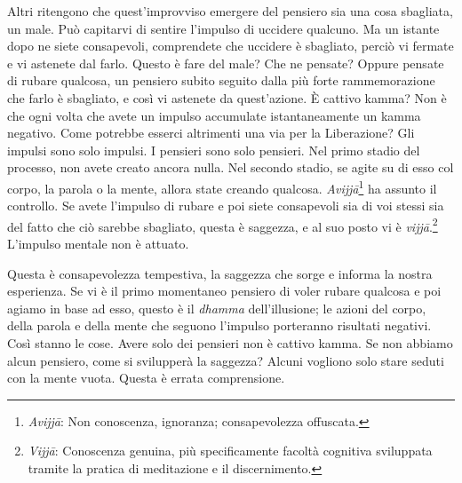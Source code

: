 Altri ritengono che quest'improvviso emergere del pensiero sia una cosa
sbagliata, un male. Può capitarvi di sentire l'impulso di uccidere
qualcuno. Ma un istante dopo ne siete consapevoli, comprendete che
uccidere è sbagliato, perciò vi fermate e vi astenete dal farlo. Questo
è fare del male? Che ne pensate? Oppure pensate di rubare qualcosa, un
pensiero subito seguito dalla più forte rammemorazione che farlo è
sbagliato, e così vi astenete da quest'azione. È cattivo kamma?
Non è che ogni volta che avete un impulso accumulate istantaneamente un
kamma negativo. Come potrebbe esserci altrimenti una via per la
Liberazione? Gli impulsi sono solo impulsi. I pensieri sono solo
pensieri. Nel primo stadio del processo, non avete creato ancora nulla.
Nel secondo stadio, se agite su di esso col corpo, la parola o la mente,
allora state creando qualcosa. \emph{Avijjā}\footnote{%
  \emph{Avijjā}: Non conoscenza, ignoranza; consapevolezza offuscata.}
ha assunto il
controllo. Se avete l'impulso di rubare e poi siete consapevoli sia di
voi stessi sia del fatto che ciò sarebbe sbagliato, questa è saggezza, e
al suo posto vi è \emph{vijjā}.\footnote{%
  \emph{Vijjā}: Conoscenza
  genuina, più specificamente facoltà cognitiva sviluppata tramite la
  pratica di meditazione e il discernimento.}
L'impulso mentale non è attuato.

Questa è consapevolezza tempestiva, la saggezza che sorge e informa la
nostra esperienza. Se vi è il primo momentaneo pensiero di voler rubare
qualcosa e poi agiamo in base ad esso, questo è il \emph{dhamma}
dell'illusione; le azioni del corpo, della parola e della mente che
seguono l'impulso porteranno risultati negativi. Così stanno le cose.
Avere solo dei pensieri non è cattivo kamma. Se non abbiamo alcun
pensiero, come si svilupperà la saggezza? Alcuni vogliono solo stare
seduti con la mente vuota. Questa è errata comprensione.

